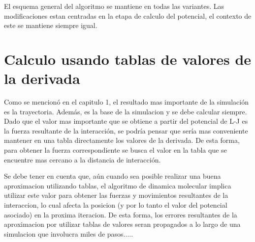 El esquema general del algoritmo se mantiene en todas las variantes. Las modificaciones estan centradas en la etapa de calculo del potencial, el contexto de este se mantiene siempre igual.



\section{Calculo usando tablas de valores de la derivada  }

Como se mencionó en el capitulo 1, el resultado mas importante de la simulación es la trayectoria. Además, es la base de la simulacion y se debe calcular siempre.
Dado que el valor mas importante que se obtiene a partir del potencial de L-J es la fuerza resultante de la interacción, se podría pensar que sería mas conveniente mantener en una tabla directamente los valores de la derivada. 
De esta forma, para obtener la fuerza correspondiente se busca el valor en la tabla que se encuentre mas cercano a la distancia de interacción. 



Se debe tener en cuenta que, aún cuando sea posible realizar una buena aproximacion utilizando tablas, el algoritmo de dinamica molecular implica utilizar este valor para obtener las fuerzas y movimientos resultantes de la interaccion, lo cual afecta la posicion (y por lo tanto el valor del potencial asociado) en la proxima iteracion. 
De esta forma, los errores resultantes de la aproximacion por utilizar tablas de valores seran propagados a lo largo de una simulacion que involucra miles de pasos.....



